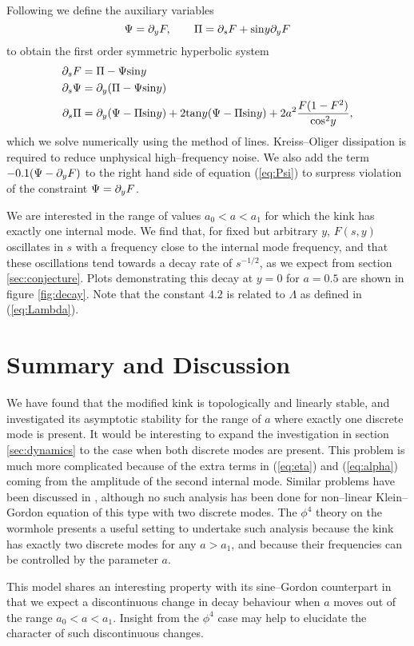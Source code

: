 Following \cite{wavemaps, sym_hyp} we define the auxiliary variables
\[
\Psi = \partial_yF, \qquad \Pi = \partial_sF + \mathrm{sin}y\partial_yF
\]
to obtain the first order symmetric hyperbolic system
\begin{align}
\partial_sF &= \Pi - \Psi\mathrm{sin}y \\
\label{eq:Psi} \partial_s\Psi &= \partial_y(\Pi-\Psi\mathrm{sin}y) \\
\partial_s\Pi &= \partial_y(\Psi-\Pi\mathrm{sin}y) + 2\mathrm{tan}y(\Psi-\Pi\mathrm{sin}y) + 2a^2\frac{F(1-F^2)}{\mathrm{cos}^2y},
\end{align}
which we solve numerically using the method of lines. Kreiss--Oliger dissipation is required to reduce unphysical high--frequency noise. We also add the term $-0.1(\Psi-\partial_yF)$ to the right hand side of equation (\ref{eq:Psi}) to surpress violation of the constraint $\Psi=\partial_yF$.

We are interested in the range of values $a_0<a<a_1$ for which the kink has exactly one internal mode. We find that, for fixed but arbitrary $y$, $F(s,y)$ oscillates in $s$ with a frequency close to the internal mode frequency, and that these oscillations tend towards a decay rate of $s^{-1/2}$, as we expect from section \ref{sec:conjecture}. Plots demonstrating this decay at $y=0$ for $a=0.5$ are shown in figure \ref{fig:decay}. Note that the constant $4.2$ is related to $\Lambda$ as defined in (\ref{eq:Lambda}).

\section{Summary and Discussion}

We have found that the modified kink is topologically and linearly stable, and investigated its asymptotic stability for the range of $a$ where exactly one discrete mode is present. It would be interesting to expand the investigation in section \ref{sec:dynamics} to the case when both discrete modes are present. This problem is much more complicated because of the extra terms in (\ref{eq:eta}) and (\ref{eq:alpha}) coming from the amplitude of the second internal mode. Similar problems have been discussed in \cite{Weinstein}, although no such analysis has been done for non--linear Klein--Gordon equation of this type with two discrete modes. The $\phi^4$ theory on the wormhole presents a useful setting to undertake such analysis because the kink has exactly two discrete modes for any $a>a_1$, and because their frequencies can be controlled by the parameter $a$.

This model shares an interesting property with its sine--Gordon counterpart in that we expect a discontinuous change in decay behaviour when $a$ moves out of the range $a_0<a<a_1$. Insight from the $\phi^4$ case may help to elucidate the character of such discontinuous changes.

 


